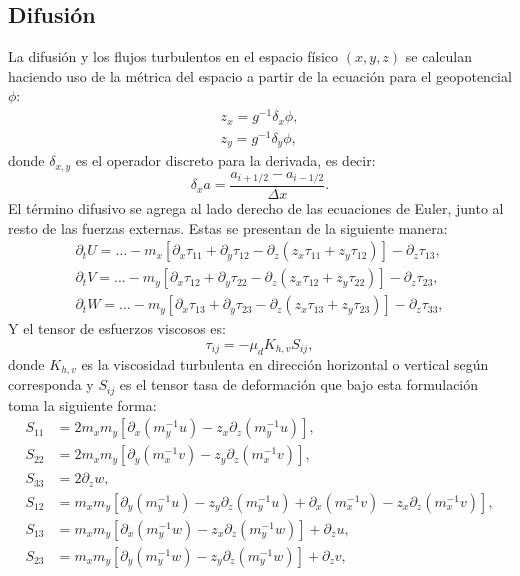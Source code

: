 \subsection{Difusión}
La difusión y los flujos turbulentos en el espacio físico $(x,y,z)$ se calculan haciendo uso de la métrica del espacio a partir de la ecuación para el geopotencial $\phi$:
\begin{eqnarray}
z_x=g^{-1}\delta_x\phi, \\
z_y=g^{-1}\delta_y\phi,
\end{eqnarray}
donde $\delta_{x,y}$ es el operador discreto para la derivada, es decir:
\begin{equation}
\delta_x a = \frac{a_{i+1/2}-a_{i-1/2}}{\Delta x}.
\end{equation}
El término difusivo se agrega al lado derecho de las ecuaciones de Euler, junto al resto de las fuerzas externas. Estas se presentan de la siguiente manera:
\begin{eqnarray}
\partial_t U = \ldots - m_x[\partial_x\tau_{11}+\partial_y\tau_{12}-\partial_z(z_x\tau_{11}+z_y\tau_{12})]-\partial_z\tau_{13}, \\
\partial_t V = \ldots - m_y[\partial_x\tau_{12}+\partial_y\tau_{22}-\partial_z(z_x\tau_{12}+z_y\tau_{22})]-\partial_z\tau_{23}, \\
\partial_t W = \ldots - m_y[\partial_x\tau_{13}+\partial_y\tau_{23}-\partial_z(z_x\tau_{13}+z_y\tau_{23})]-\partial_z\tau_{33},
\end{eqnarray}
Y el tensor de esfuerzos viscosos es:
\begin{equation}
\tau_{ij} = -\mu_d K_{h,v}S_{ij},
\end{equation}
donde $K_{h,v}$ es la viscosidad turbulenta en dirección horizontal o vertical según corresponda y $S_{ij}$ es el tensor tasa de deformación que bajo esta formulación toma la siguiente forma:
\begin{align}
S_{11} &= 2m_xm_y[\partial_x(m_y^{-1}u)-z_x\partial_z(m_y^{-1}u)],  \\
S_{22} &= 2m_xm_y[\partial_y(m_x^{-1}v)-z_y\partial_z(m_x^{-1}v)],  \\
S_{33} &= 2\partial_z w,  \\
S_{12} &= m_xm_y[\partial_y(m_y^{-1}u)-z_y\partial_z(m_y^{-1}u)+\partial_x(m_x^{-1}v)-z_x\partial_z(m_x^{-1}v)],  \\
S_{13} &= m_xm_y[\partial_x(m_y^{-1}w)-z_x\partial_z(m_y^{-1}w)]+\partial_z u,  \\
S_{23} &= m_xm_y[\partial_y(m_y^{-1}w)-z_y\partial_z(m_y^{-1}w)]+\partial_z v,  \\%
\end{align}

